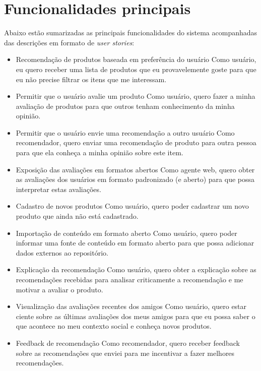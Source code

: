 \section{Funcionalidades principais} %
\label{sec:funcionalidades_principais}

Abaixo estão sumarizadas as principais funcionalidades do sistema acompanhadas das descrições em formato de \textit{user stories}:

\begin{itemize}

	\item Recomendação de produtos baseada em preferência do usuário
	\subitem Como usuário, eu quero receber uma lista de produtos que eu provavelemente goste para que eu não precise filtrar os itens que me interessam.

	\item Permitir que o usuário avalie um produto
  \subitem Como usuário, quero fazer a minha avaliação de produtos para que outros tenham conhecimento da minha opinião.

	\item Permitir que o usuário envie uma recomendação a outro usuário
  \subitem Como recomendador, quero enviar uma recomendação de produto para outra pessoa para que ela conheça a minha opinião sobre este item.


	\item Exposição das avaliações em formatos abertos
  \subitem Como agente web, quero obter as avaliações dos usuários em formato padronizado (e aberto) para que possa interpretar estas avaliações.


    \item Cadastro de novos produtos
    \subitem Como usuário, quero poder cadastrar um novo produto que ainda não está cadastrado.
    

    \item Importação de conteúdo em formato aberto
    \subitem Como usuário, quero poder informar uma fonte de conteúdo em formato aberto para que possa adicionar dados externos ao repositório.

    \item Explicação da recomendação
    \subitem Como usuário, quero obter a explicação sobre as recomendações recebidas para analisar criticamente a recomendação e me motivar a avaliar o produto.

    \item Visualização das avaliações recentes dos amigos
    \subitem Como usuário, quero estar ciente sobre as últimas avaliações dos meus amigos para que eu possa saber o que acontece no meu contexto social e conheça novos produtos.

    \item Feedback de recomendação
    \subitem Como recomendador, quero receber feedback sobre as recomendações que enviei para me incentivar a fazer melhores recomendações.

	
\end{itemize}

